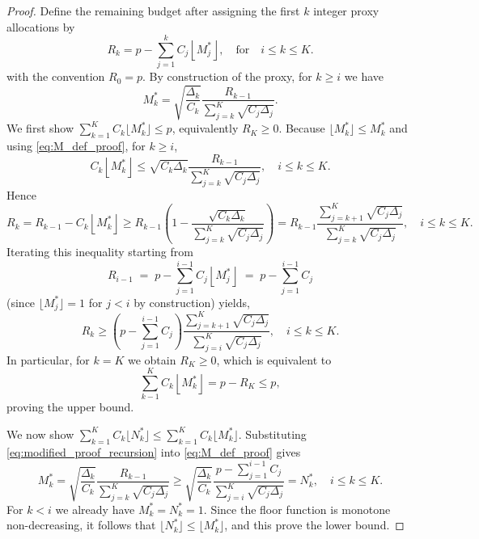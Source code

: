 \begin{proof}
Define the remaining budget after assigning the first $k$ integer proxy allocations by 
\[
R_k = p-\sum_{j=1}^k C_j \left\lfloor M_j^* \right\rfloor, \quad \text{for}\quad i\le k\le K.
\]
with the convention $R_0=p$. By construction of the proxy, for $k\ge i$ we have
%
\begin{equation}\label{eq:M_def_proof}
    M_k^*=\sqrt{\frac{\Delta_k}{C_k}}\frac{R_{k-1}}{\sum_{j=k}^{K}\sqrt{C_j\Delta_j}}.
\end{equation}
%
We first show $\sum_{k=1}^K C_k\lfloor M_k^*\rfloor \le p$, equivalently $R_K\ge 0$.
Because $\lfloor M_k^*\rfloor \le M_k^*$ and using \eqref{eq:M_def_proof}, for $k\ge i$,
\[
C_k \left\lfloor M_k^* \right\rfloor\le \sqrt{C_k\Delta_k}\frac{R_{k-1}}{\sum_{j=k}^{K}\sqrt{C_j\Delta_j}}, \quad i\le k\le K.
\]
Hence
%
\begin{equation*}
    R_k = R_{k-1}-C_k  \left\lfloor M_k^* \right\rfloor\ge R_{k-1}\left(1-\frac{\sqrt{C_k\Delta_k}}{\sum_{j=k}^{K}\sqrt{C_j\Delta_j}}\right) = R_{k-1}\frac{\sum_{j=k+1}^{K}\sqrt{C_j\Delta_j}}{\sum_{j=k}^{K}\sqrt{C_j\Delta_j}}, \quad i\le k\le K.
\end{equation*}
%
Iterating this inequality starting from
%
\[
R_{i-1} \;=\; p - \sum_{j=1}^{i-1} C_j \left\lfloor M_j^*\right\rfloor
         \;=\; p - \sum_{j=1}^{i-1} C_j
\]
%
(since $\lfloor M_j^*\rfloor =1$ for $j<i$ by construction) yields,
%
\begin{equation}\label{eq:modified_proof_recursion}
R_{k}\ge \left(p-\sum_{j=1}^{i-1}C_j\right)\frac{\sum_{j=k+1}^K \sqrt{C_j\Delta_j}}{\sum_{j=i}^K \sqrt{C_j\Delta_j}},\quad i\le k\le K.
\end{equation}
%
In particular, for $k=K$ we obtain $R_K\ge 0$, which is equivalent to
%
\begin{equation*}\label{eq:modified_total_cost}
    \sum_{k-1}^K C_k\left\lfloor M_k^* \right\rfloor=p-R_K\le p,
\end{equation*}
proving the upper bound.

We now show
$\sum_{k=1}^K C_k\lfloor N_k^*\rfloor \le \sum_{k=1}^K C_k\lfloor M_k^*\rfloor$.
Substituting \eqref{eq:modified_proof_recursion} into \eqref{eq:M_def_proof} gives
%
\begin{equation}\label{eq:Modified_nondecreasing_sample_size_proof}
    M_k^* = \sqrt{\frac{\Delta_k}{C_k}}\frac{R_{k-1}}{\sum_{j=k}^{K}\sqrt{C_j\Delta_j}}\ge \sqrt{\frac{\Delta_k}{C_k}}\frac{p-\sum_{j=1}^{i-1}C_j}{\sum_{j=i}^K \sqrt{C_j\Delta_j}}=N_k^*, \quad i\le k\le K.
\end{equation}
%
For $k<i$ we already have $M_k^*=N_k^*=1$. Since the floor function is monotone non-decreasing, it follows that $\lfloor N_k^* \rfloor\le \lfloor M_k^* \rfloor$, and this prove the lower bound.
\end{proof}


